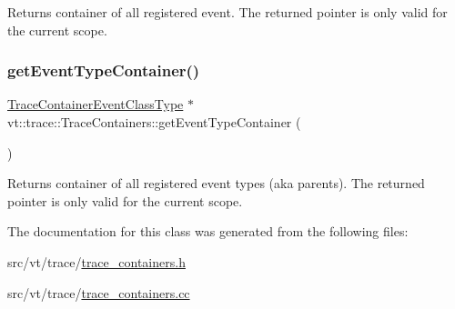 Returns container of all registered event. The returned pointer is only valid for the current scope. \mbox{\label{classvt_1_1trace_1_1_trace_containers_aa7c9e38e33ed891e369d1ac959ce17fb}} 
\subsubsection{\texorpdfstring{get\+Event\+Type\+Container()}{getEventTypeContainer()}}
{\footnotesize\ttfamily \hyperlink{namespacevt_1_1trace_a352c8799ee88afa3f1b7008952ed8485}{Trace\+Container\+Event\+Class\+Type} $\ast$ vt\+::trace\+::\+Trace\+Containers\+::get\+Event\+Type\+Container (\begin{DoxyParamCaption}{ }\end{DoxyParamCaption})\hspace{0.3cm}{\ttfamily [static]}}

Returns container of all registered event types (aka parents). The returned pointer is only valid for the current scope. 

The documentation for this class was generated from the following files\+:\begin{DoxyCompactItemize}
\item 
src/vt/trace/\hyperlink{trace__containers_8h}{trace\+\_\+containers.\+h}\item 
src/vt/trace/\hyperlink{trace__containers_8cc}{trace\+\_\+containers.\+cc}\end{DoxyCompactItemize}
